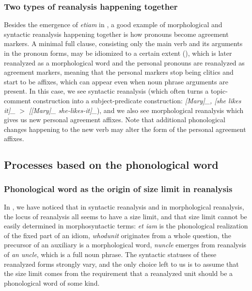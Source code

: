 \documentclass[a4paper, oneside, scheme=plain, 12pt]{article}
\newcommand{\form}[1]{\emph{#1}}
\newcommand*{\textgt}{$>$ }
\begin{document}
\subsubsection{Two types of reanalysis happening together}\label{sec:both-types-of-reanalysis}

Besides the emergence of \form{etiam} in ,
a good example of morphological and syntactic reanalysis happening together 
is how pronouns become agreement markers.
A minimal full clause, consisting only the main verb and its arguments in the pronoun forms,
may be idiomized to a certain extent (),
which is later reanalyzed as a morphological word and the personal pronouns are reanalyzed as agreement markers, meaning that the personal markers stop being clitics and start to be affixes,
which can appear even when noun phrase arguments are present.
In this case, we see syntactic reanalysis 
(which often turns a topic-comment construction into a subject-predicate construction:
\form{[Mary]_{}, [she likes it]_{\text{comment:nucleus clause}}} \textgt \form{[[Mary]_{} she-likes-it]_{\text{nucleus clause}}}),
and we also see morphological reanalysis which gives us new personal agreement affixes.
Note that additional phonological changes happening to the new verb may alter the form of the personal agreement affixes.

\subsection{Processes based on the phonological word}\label{sec:phonological-word-evolution}

\subsubsection{Phonological word as the origin of size limit in reanalysis}\label{sec:reanalysis-size-limit-phonological-word}

In , we have noticed that in syntactic reanalysis and in morphological reanalysis,
the locus of reanalysis all seems to have a size limit,
and that size limit cannot be easily determined in morphosyntactic terms:
\form{et iam} is the phonological realization of the fixed part of an idiom,
\form{whodunit} originates from a whole question,
the precursor of an auxiliary is a morphological word,
\form{nuncle} emerges from reanalysis of \form{an uncle}, which is a full noun phrase.
The syntactic statuses of these reanalyzed forms strongly vary,
and the only choice left to us is to assume that the size limit comes from the requirement that a reanalyzed unit should be a phonological word of some kind.
\end{document}
